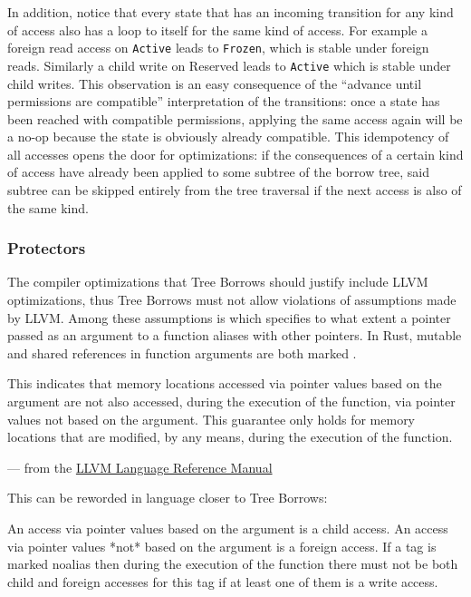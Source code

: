 \documentclass[a4paper,11pt]{article}
\theoremstyle{plain}
\theoremstyle{definition}
\theoremstyle{remark}
\newcommand{\tcode}[1]{\rstinline{#1}}
\newcommand{\tperm}[1]{\texttt{#1}}
\begin{document}
In addition, notice that every state that has an incoming transition for any kind of
access also has a loop to itself for the same kind of access. For example a foreign read
access on \tperm{Active} leads to \tperm{Frozen}, which is stable under foreign reads. Similarly
a child write on Reserved leads to \tperm{Active} which is stable under child writes.
This observation is an easy consequence of the ``advance until permissions are compatible''
interpretation of the transitions: once a state has been reached with compatible
permissions, applying the same access again will be a no-op because the state
is obviously already compatible. This idempotency of all accesses opens the door
for optimizations: if the consequences of a certain kind of access have already
been applied to some subtree of the borrow tree, said subtree can be skipped entirely
from the tree traversal if the next access is also of the same kind.


\subsubsection{Protectors}

The compiler optimizations that Tree Borrows should justify include LLVM optimizations,
thus Tree Borrows must not allow violations of assumptions made by LLVM. Among these
assumptions is \tcode{noalias} which specifies to what extent a pointer passed as an
argument to a function aliases with other pointers. In Rust, mutable and shared
references in function arguments are both marked \tcode{noalias}.

\begin{minipage}{0.7\textwidth}
    \tcode{noalias}

    This indicates that memory locations accessed via pointer values based on the argument
    are not also accessed, during the execution of the function, via pointer values not based on
    the argument. This guarantee only holds for memory locations that are modified,
    by any means, during the execution of the function.

    --- from the \href{https://llvm.org/docs/LangRef.html}{LLVM Language Reference Manual}
\end{minipage}

This can be reworded in language closer to Tree Borrows:

\begin{indent}
An access via pointer values based on the argument is a child access.
An access via pointer values *not* based on the argument is a foreign access.
If a tag is marked noalias then during the execution of the function there must
not be both child and foreign accesses for this tag if at least one of them is a write access.
\end{indent}
\end{document}
